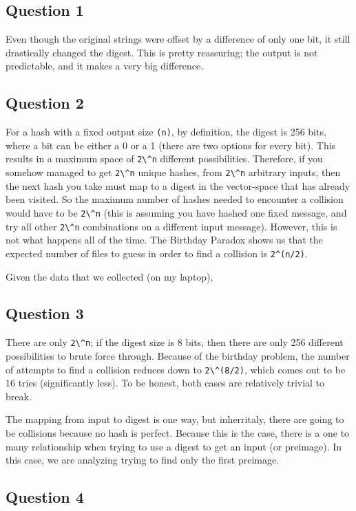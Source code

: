 \documentclass[11pt]{article}
\begin{document}
\subsection*{Question 1}
Even though the original strings were offset by a difference of only one bit, it still drastically changed the digest. This is pretty reassuring; the output is not predictable, and it makes a very big difference.

\subsection*{Question 2}
For a hash with a fixed output size \verb|(n)|, by definition, the digest is 256 bits, where a bit can be either a 0 or a 1 (there are two options for every bit). This results in a maximum space of \verb|2\^n| different possibilities. Therefore, if you somehow managed to get \verb|2\^n| unique hashes, from \verb|2\^n| arbitrary inputs, then the next hash you take must map to a digest in the vector-space that has already been visited. So the maximum number of hashes needed to encounter a collision would have to be \verb|2\^n| (this is assuming you have hashed one fixed message, and try all other \verb|2\^n| combinations on a different input message). However, this is not what happens all of the time. The Birthday Paradox shows us that the expected number of files to guess in order to find a collision is \verb|2^(n/2)|.

Given the data that we collected (on my laptop),


\subsection*{Question 3}
There are only \verb|2\^n|; if the digest size is 8 bits, then there are only 256 different possibilities to brute force through. Because of the birthday problem, the number of attempts to find a collision reduces down to \verb|2\^(8/2)|, which comes out to be 16 tries (significantly less). To be honest, both cases are relatively trivial to break.

The mapping from input to digest is one way, but inherritaly, there are going to be collisions because no hash is perfect. Because this is the case, there is a one to many relationship when trying to use a digest to get an input (or preimage). In this case, we are analyzing trying to find only the first preimage. 

\subsection*{Question 4}
\end{document}
